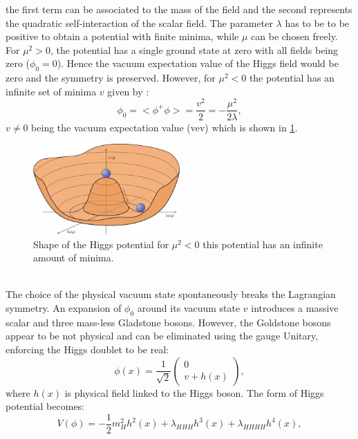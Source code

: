 the first term can be associated to the mass of the field and the second represents the quadratic self-interaction of the scalar field. The parameter $\lambda$ has to be to be positive to obtain a potential with finite minima, while $\mu$ can be chosen freely. For $\mu^{2} > 0$, the potential has a single ground state at zero with all fields being zero ($\phi_0 = 0$). Hence the vacuum expectation value of the Higgs field would be zero and the symmetry is preserved. However, for $\mu^{2} < 0$ the potential has an infinite set of minima $v$ given by :
\begin{equation}
    \phi_{0}=<\phi^{+} \phi>=\frac{v^{2}}{2}=-\frac{\mu^{2}}{2 \lambda},
\end{equation}
$v\neq0$ being the vacuum expectation value (vev) which is shown in \ref{fig:chap1:Higggs_potential}.
\begin{figure}[ht]
    \centering
    \includegraphics[width=0.5\textwidth]{Ch1/Img/Higgs_potential.png}
    \caption{Shape of the Higgs potential for $\mu^{2} < 0$ this potential has an infinite amount of minima.}
    \label{fig:chap1:Higggs_potential}
\end{figure}
\\
The choice of the physical vacuum state spontaneously breaks the Lagrangian symmetry. An expansion of $\phi_0$ around its vacuum state $v$ introduces a massive scalar and three mass-less Gladstone bosons. However, the Goldstone bosons appear to be not physical and can be eliminated using the gauge Unitary, enforcing the Higgs doublet to be real:
\begin{equation}
    \phi(x)=\frac{1}{\sqrt{2}}\left(\begin{array}{c}
0 \\
v+h(x)
\end{array}\right),
\end{equation}
where $h(x)$ is physical field linked to the Higgs boson. The form of Higgs potential becomes: \begin{equation}
    V(\phi)=-\frac{1}{2} m_{H}^{2} h^{2}(x)+\lambda_{H H H} h^{3}(x)+\lambda_{H H H H} h^{4}(x),
\end{equation}
